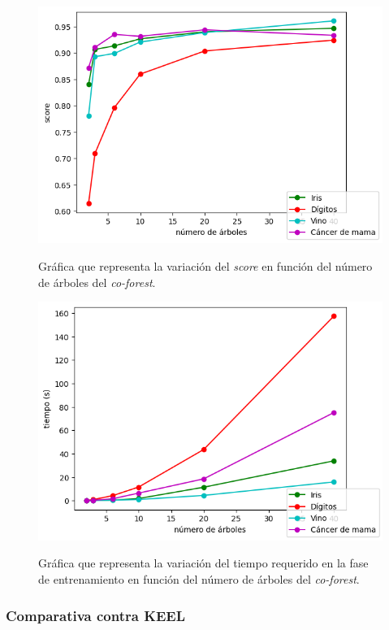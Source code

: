 \begin{figure}[h]
	\caption{Gráfica que representa la variación del \textit{score} en función del número de árboles del \textit{co-forest}.}
	\centering
	\includegraphics[scale=0.7]{../img/memoria/5_coforest_score-arboles}
	\label{5_score-arboles}
\end{figure}

\begin{figure}[h]
	\caption{Gráfica que representa la variación del tiempo requerido en la fase de entrenamiento en función del número de árboles del \textit{co-forest}.}
	\centering
	\includegraphics[scale=0.7]{../img/memoria/5_coforest_tiempo-arboles}
	\label{5_tiempo-arboles}
\end{figure}

\subsubsection{Comparativa contra KEEL}

